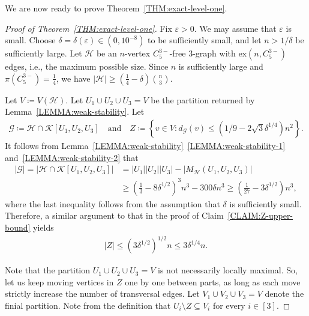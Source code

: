 \documentclass[11pt,a4paper]{article}
\theoremstyle{remark}
\begin{document}
We are now ready to prove Theorem~\ref{THM:exact-level-one}. 
%
\begin{proof}[Proof of Theorem~\ref{THM:exact-level-one}]
    Fix $\varepsilon >0$. We may assume that $\varepsilon$ is small. 
    Choose $\delta = \delta(\varepsilon) \in (0, 10^{-8})$ to be sufficiently small, and let $n > 1/\delta$ be sufficiently large. 
    Let $\mathcal{H}$ be an $n$-vertex $C_{5}^{3-}$-free $3$-graph with $\mathrm{ex}(n,C_{5}^{3-})$ edges, i.e., the maximum possible size. Since $n$ is sufficiently large and $\pi(C_{5}^{3-}) = \frac{1}{4}$, we have $|\mathcal{H}| \ge \left(\frac{1}{4} - \delta\right)\binom{n}{3}$. 
    
    Let $V \coloneqq V(\mathcal{H})$. 
    Let $U_1 \cup U_2 \cup U_3 = V$ be the partition returned by Lemma~\ref{LEMMA:weak-stability}. 
    Let 
    \begin{align*}
        \mathcal{G} \coloneqq \mathcal{H} \cap \mathcal{K}[U_1, U_2, U_3]
        \quad\text{and}\quad 
        Z \coloneqq \left\{v\in V \colon d_{\mathcal{G}}(v) \le \left(1/9 - 2\sqrt{3}\delta^{1/4}\right)n^2\right\}.
    \end{align*}
        It follows from Lemma~\ref{LEMMA:weak-stability}~\ref{LEMMA:weak-stability-1} and~\ref{LEMMA:weak-stability-2} that 
    \begin{align*}
        |\mathcal{G}| 
        = |\mathcal{H} \cap \mathcal{K}[U_1, U_2, U_3]|
        & = |U_1||U_2||U_3| - |M_{\mathcal{H}}(U_1, U_2, U_3)| \\
        & \ge \left(\frac{1}{3} - 8\delta^{1/2}\right)^3 n^3 - 300\delta n^{3} 
        \ge \left(\frac{1}{27} - 3\delta^{1/2}\right) n^3,
    \end{align*}
    where the last inequality follows from the assumption that $\delta$ is sufficiently small. Therefore, a similar argument to that in the proof of Claim~\ref{CLAIM:Z-upper-bound} yields 
    \begin{align}\label{equ:Z-upper-bound-2}
        |Z| \le \left(3\delta^{1/2}\right)^{1/2}n \le 3 \delta^{1/4} n.
    \end{align}
    
    Note that the partition $U_1 \cup U_2 \cup U_3 = V$ is not necessarily locally maximal. So, let us keep moving vertices in $Z$ one by one between parts, as long as each move strictly increase the number of transversal edges. 
    Let $V_1 \cup V_2 \cup V_3 = V$ denote the finial partition. Note from the definition that $U_i \setminus Z \subseteq V_i$ for every $i \in [3]$. 



\end{proof}
\end{document}

